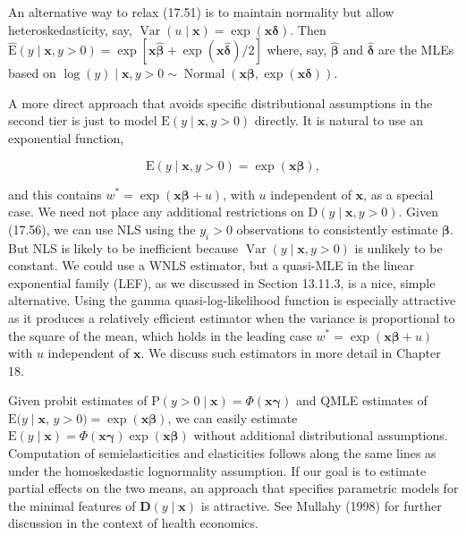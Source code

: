 \documentclass[10pt]{article}
\begin{document}
An alternative way to relax (17.51) is to maintain normality but allow heteroskedasticity, say, $\operatorname{Var}(u \mid \mathbf{x})=\exp (\mathbf{x} \boldsymbol{\delta})$. Then $\hat{\mathrm{E}}(y \mid \mathbf{x}, y>0)=\exp [\mathbf{x} \hat{\boldsymbol{\beta}}+\exp (\mathbf{x} \hat{\boldsymbol{\delta}}) / 2]$ where, say, $\hat{\boldsymbol{\beta}}$ and $\hat{\boldsymbol{\delta}}$ are the MLEs based on $\log (y) \mid \mathbf{x}, y>0 \sim \operatorname{Normal}(\mathbf{x} \boldsymbol{\beta}, \exp (\mathbf{x} \boldsymbol{\delta}))$.

A more direct approach that avoids specific distributional assumptions in the second tier is just to model $\mathrm{E}(y \mid \mathbf{x}, y>0)$ directly. It is natural to use an exponential function,


\begin{equation*}
\mathrm{E}(y \mid \mathbf{x}, y>0)=\exp (\mathbf{x} \boldsymbol{\beta}), \tag{17.56}
\end{equation*}


and this contains $w^{*}=\exp (\mathbf{x} \boldsymbol{\beta}+u)$, with $u$ independent of $\mathbf{x}$, as a special case. We need not place any additional restrictions on $\mathrm{D}(y \mid \mathbf{x}, y>0)$. Given (17.56), we can use NLS using the $y_{i}>0$ observations to consistently estimate $\boldsymbol{\beta}$. But NLS is likely to be inefficient because $\operatorname{Var}(y \mid \mathbf{x}, y>0)$ is unlikely to be constant. We could use a WNLS estimator, but a quasi-MLE in the linear exponential family (LEF), as we discussed in Section 13.11.3, is a nice, simple alternative. Using the gamma quasi-log-likelihood function is especially attractive as it produces a relatively efficient estimator when the variance is proportional to the square of the mean, which holds in the leading case $w^{*}=\exp (\mathbf{x} \boldsymbol{\beta}+u)$ with $u$ independent of $\mathbf{x}$. We discuss such estimators in more detail in Chapter 18.

Given probit estimates of $\mathrm{P}(y>0 \mid \mathbf{x})=\Phi(\mathbf{x} \boldsymbol{\gamma})$ and QMLE estimates of $\mathrm{E}(y \mid \mathbf{x}$, $y>0)=\exp (\mathbf{x} \boldsymbol{\beta})$, we can easily estimate $\mathrm{E}(y \mid \mathbf{x})=\Phi(\mathbf{x} \boldsymbol{\gamma}) \exp (\mathbf{x} \boldsymbol{\beta})$ without additional distributional assumptions. Computation of semielasticities and elasticities follows along the same lines as under the homoskedastic lognormality assumption. If our goal is to estimate partial effects on the two means, an approach that specifies parametric models for the minimal features of $\mathbf{D}(y \mid \mathbf{x})$ is attractive. See Mullahy (1998) for further discussion in the context of health economics.
\end{document}

